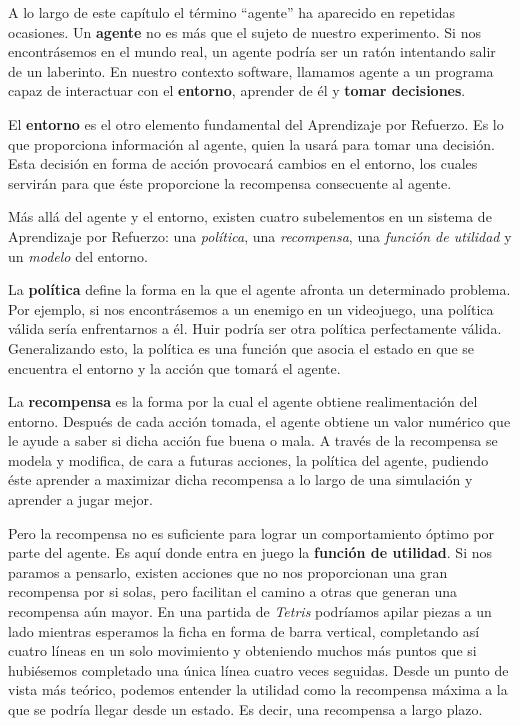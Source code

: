 A lo largo de este capítulo el término ``agente'' ha aparecido en repetidas ocasiones. Un \textbf{agente} no es más que el sujeto de nuestro experimento. Si nos encontrásemos en el mundo real, un agente podría ser un ratón intentando salir de un laberinto. En nuestro contexto software, llamamos agente a un programa capaz de interactuar con el \textbf{entorno}, aprender de él y \textbf{tomar decisiones}.

El \textbf{entorno} es el otro elemento fundamental del Aprendizaje por Refuerzo. Es lo que proporciona información al agente, quien la usará para tomar una decisión. Esta decisión en forma de acción provocará cambios en el entorno, los cuales servirán para que éste proporcione la recompensa consecuente al agente.

Más allá del agente y el entorno, existen cuatro subelementos en un sistema de Aprendizaje por Refuerzo: una \textit{política}, una \textit{recompensa}, una \textit{función de utilidad} y un \textit{modelo} del entorno.

La \textbf{política} define la forma en la que el agente afronta un determinado problema. Por ejemplo, si nos encontrásemos a un enemigo en un videojuego, una política válida sería enfrentarnos a él. Huir podría ser otra política perfectamente válida. Generalizando esto, la política es una función que asocia el estado en que se encuentra el entorno y la acción que tomará el agente.

La \textbf{recompensa} es la forma por la cual el agente obtiene realimentación del entorno. Después de cada acción tomada, el agente obtiene un valor numérico que le ayude a saber si dicha acción fue buena o mala. A través de la recompensa se modela y modifica, de cara a futuras acciones, la política del agente, pudiendo éste aprender a maximizar dicha recompensa a lo largo de una simulación y aprender a jugar mejor.

Pero la recompensa no es suficiente para lograr un comportamiento óptimo por parte del agente. Es aquí donde entra en juego la \textbf{función de utilidad}. Si nos paramos a pensarlo, existen acciones que no nos proporcionan una gran recompensa por si solas, pero facilitan el camino a otras que generan una recompensa aún mayor. En una partida de \textit{Tetris} podríamos apilar piezas a un lado mientras esperamos la ficha en forma de barra vertical, completando así cuatro líneas en un solo movimiento y obteniendo muchos más puntos que si hubiésemos completado una única línea cuatro veces seguidas. Desde un punto de vista más teórico, podemos entender la utilidad como la recompensa máxima a la que se podría llegar desde un estado. Es decir, una recompensa a largo plazo.

